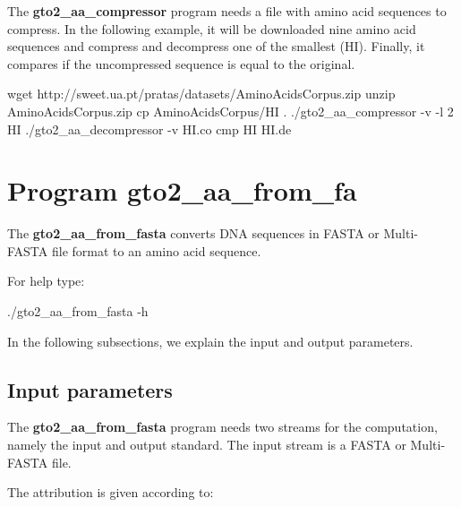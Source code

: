 \documentclass[11pt,]{krantz}
\newenvironment{Shaded}{\begin{snugshade}}{\end{snugshade}}
\newcommand{\FunctionTok}[1]{\textcolor[rgb]{0,0,0}{#1}}
\newcommand{\ExtensionTok}[1]{#1}
\newcommand{\NormalTok}[1]{#1}
\begin{document}
The \textbf{gto2\_aa\_compressor} program needs a file with amino acid
sequences to compress. In the following example, it will be downloaded
nine amino acid sequences and compress and decompress one of the
smallest (HI). Finally, it compares if the uncompressed sequence is
equal to the original.

\begin{Shaded}
\begin{Highlighting}[]
\FunctionTok{wget}\NormalTok{ http://sweet.ua.pt/pratas/datasets/AminoAcidsCorpus.zip}
\FunctionTok{unzip}\NormalTok{ AminoAcidsCorpus.zip}
\FunctionTok{cp}\NormalTok{ AminoAcidsCorpus/HI .}
\ExtensionTok{./gto2_aa_compressor}\NormalTok{ -v -l 2 HI}
\ExtensionTok{./gto2_aa_decompressor}\NormalTok{ -v HI.co}
\FunctionTok{cmp}\NormalTok{ HI HI.de}
\end{Highlighting}
\end{Shaded}

\section{Program gto2\_aa\_from\_fa}\label{program-gto2_aa_from_fa}

The \textbf{gto2\_aa\_from\_fasta} converts DNA sequences in FASTA or
Multi-FASTA file format to an amino acid sequence.

For help type:

\begin{Shaded}
\begin{Highlighting}[]
\ExtensionTok{./gto2_aa_from_fasta}\NormalTok{ -h}
\end{Highlighting}
\end{Shaded}

In the following subsections, we explain the input and output
parameters.

\subsection*{Input parameters}\label{input-parameters-29}


The \textbf{gto2\_aa\_from\_fasta} program needs two streams for the
computation, namely the input and output standard. The input stream is a
FASTA or Multi-FASTA file.

The attribution is given according to:
\end{document}
